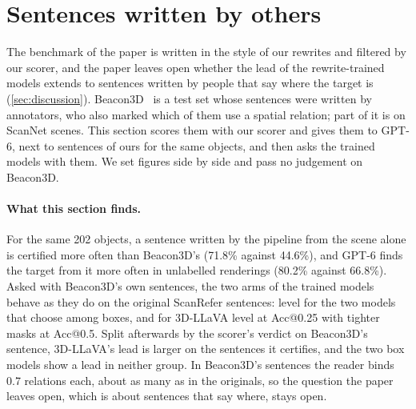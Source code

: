 \section{Sentences written by others}
\label{supp:external}
The benchmark of the paper is written in the style of our rewrites and filtered by our scorer, and the paper leaves open whether the lead of the rewrite-trained models extends to sentences written by people that say where the target is (\cref{sec:discussion}).
Beacon3D~\cite{beacon3d} is a test set whose sentences were written by annotators, who also marked which of them use a spatial relation; part of it is on ScanNet scenes.
This section scores them with our scorer and gives them to GPT-6, next to sentences of ours for the same objects, and then asks the trained models with them.
We set figures side by side and pass no judgement on Beacon3D.

\paragraph{What this section finds.}
For the same 202 objects, a sentence written by the pipeline from the scene alone is certified more often than Beacon3D's (71.8\% against 44.6\%), and GPT-6 finds the target from it more often in unlabelled renderings (80.2\% against 66.8\%).
Asked with Beacon3D's own sentences, the two arms of the trained models behave as they do on the original ScanRefer sentences: level for the two models that choose among boxes, and for 3D-LLaVA level at Acc@0.25 with tighter masks at Acc@0.5.
Split afterwards by the scorer's verdict on Beacon3D's sentence, 3D-LLaVA's lead is larger on the sentences it certifies, and the two box models show a lead in neither group.
In Beacon3D's sentences the reader binds 0.7 relations each, about as many as in the originals, so the question the paper leaves open, which is about sentences that say where, stays open.

